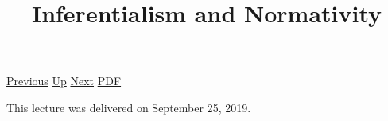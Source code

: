 \documentclass[12pt,a4paper]{report}
\begin{document}
 \href{doc/phil/People/Brandom/OnSellars/2019/EmpiricismandthePhilosophyofMind.html}{Previous} 
 \href{doc/phil/People/Brandom/OnSellars/2019.html}{Up} 
 \href{doc/phil/People/Brandom/OnSellars/2019/Introduction.html}{Next} 
 \href{doc/phil/People/Brandom/OnSellars/2019/InferentialismandNormativity.pdf}{PDF} 
\title{Inferentialism and Normativity}

\tableofcontents
This lecture was delivered on September 25, 2019.
\end{document}
